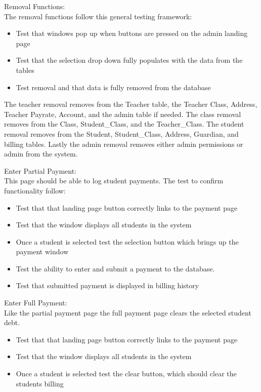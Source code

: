 Removal Functions:\\
The removal functions follow this general testing framework:

\begin{itemize}
\item Test that windows pop up when buttons are pressed on the admin landing page
\item Test that the selection drop down fully populates with the data from the tables
\item Test removal and that data is fully removed from the database
\end{itemize}

The teacher removal removes from the Teacher table, the Teacher Class, Address, Teacher Payrate, Account, and the admin table if needed. The class removal removes from the Class, Student\_Class, and the Teacher\_Class. The student removal removes from the Student, Student\_Class, Address, Guardian, and billing tables. Lastly the admin removal removes either admin permissions or admin from the system.
  
Enter Partial Payment:\\
This page should be able to log student payments. The test to confirm functionality follow:

\begin{itemize}
\item Test that that landing page button correctly links to the payment page
\item Test that the window displays all students in the system
\item Once a student is selected test the selection button which brings up the payment window
\item Test the ability to enter and submit a payment to the database.
\item Test that submitted payment is displayed in billing history
\end{itemize}

Enter Full Payment:\\
Like the partial payment page the full payment page clears the selected student debt.

\begin{itemize}
\item Test that that landing page button correctly links to the payment page
\item Test that the window displays all students in the system
\item Once a student is selected test the clear button, which should clear the students billing
\end{itemize}


